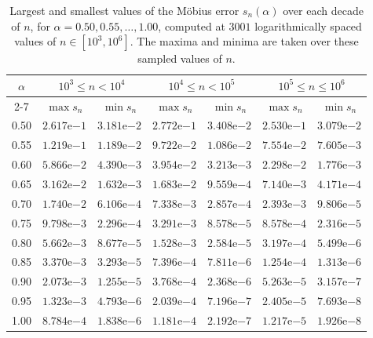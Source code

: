 \documentclass[11pt]{extarticle}
\numberwithin{equation}{section}
\theoremstyle{plain}
\theoremstyle{remark}
\begin{document}
\begin{table}[htb!]
\centering
\footnotesize
\begin{tabular}{|c|cc|cc|cc|}
\hline
\multirow{2}{*}{$\alpha$} & \multicolumn{2}{c|}{$10^{3} \leq n < 10^{4}$} & \multicolumn{2}{c|}{$10^{4} \leq n < 10^{5}$} & \multicolumn{2}{c|}{$10^{5} \leq n \leq 10^{6}$} \\
\cline{2-7}
 & $\max s_n$ & $\min s_n$ & $\max s_n$ & $\min s_n$ & $\max s_n$ & $\min s_n$ \\
\hline\hline
0.50 & $2.617\mathrm{e}{-1}$ & $3.181\mathrm{e}{-2}$ & $2.772\mathrm{e}{-1}$ & $3.408\mathrm{e}{-2}$ & $2.530\mathrm{e}{-1}$ & $3.079\mathrm{e}{-2}$ \\
0.55 & $1.219\mathrm{e}{-1}$ & $1.189\mathrm{e}{-2}$ & $9.722\mathrm{e}{-2}$ & $1.086\mathrm{e}{-2}$ & $7.554\mathrm{e}{-2}$ & $7.605\mathrm{e}{-3}$ \\
0.60 & $5.866\mathrm{e}{-2}$ & $4.390\mathrm{e}{-3}$ & $3.954\mathrm{e}{-2}$ & $3.213\mathrm{e}{-3}$ & $2.298\mathrm{e}{-2}$ & $1.776\mathrm{e}{-3}$ \\
0.65 & $3.162\mathrm{e}{-2}$ & $1.632\mathrm{e}{-3}$ & $1.683\mathrm{e}{-2}$ & $9.559\mathrm{e}{-4}$ & $7.140\mathrm{e}{-3}$ & $4.171\mathrm{e}{-4}$ \\
0.70 & $1.740\mathrm{e}{-2}$ & $6.106\mathrm{e}{-4}$ & $7.338\mathrm{e}{-3}$ & $2.857\mathrm{e}{-4}$ & $2.393\mathrm{e}{-3}$ & $9.806\mathrm{e}{-5}$ \\
0.75 & $9.798\mathrm{e}{-3}$ & $2.296\mathrm{e}{-4}$ & $3.291\mathrm{e}{-3}$ & $8.578\mathrm{e}{-5}$ & $8.578\mathrm{e}{-4}$ & $2.316\mathrm{e}{-5}$ \\
0.80 & $5.662\mathrm{e}{-3}$ & $8.677\mathrm{e}{-5}$ & $1.528\mathrm{e}{-3}$ & $2.584\mathrm{e}{-5}$ & $3.197\mathrm{e}{-4}$ & $5.499\mathrm{e}{-6}$ \\
0.85 & $3.370\mathrm{e}{-3}$ & $3.293\mathrm{e}{-5}$ & $7.396\mathrm{e}{-4}$ & $7.811\mathrm{e}{-6}$ & $1.254\mathrm{e}{-4}$ & $1.313\mathrm{e}{-6}$ \\
0.90 & $2.073\mathrm{e}{-3}$ & $1.255\mathrm{e}{-5}$ & $3.768\mathrm{e}{-4}$ & $2.368\mathrm{e}{-6}$ & $5.263\mathrm{e}{-5}$ & $3.157\mathrm{e}{-7}$ \\
0.95 & $1.323\mathrm{e}{-3}$ & $4.793\mathrm{e}{-6}$ & $2.039\mathrm{e}{-4}$ & $7.196\mathrm{e}{-7}$ & $2.405\mathrm{e}{-5}$ & $7.693\mathrm{e}{-8}$ \\
1.00 & $8.784\mathrm{e}{-4}$ & $1.838\mathrm{e}{-6}$ & $1.181\mathrm{e}{-4}$ & $2.192\mathrm{e}{-7}$ & $1.217\mathrm{e}{-5}$ & $1.926\mathrm{e}{-8}$ \\
\hline
\end{tabular}
\caption{Largest and smallest values of the M\"obius error $s_n(\alpha)$ over
each decade of $n$, for $\alpha = 0.50, 0.55, \dots, 1.00$, computed at $3001$
logarithmically spaced values of $n \in [10^3, 10^6]$. The maxima and minima are
taken over these sampled values of $n$.}
\label{tab:envelope}
\end{table}
\end{document}
